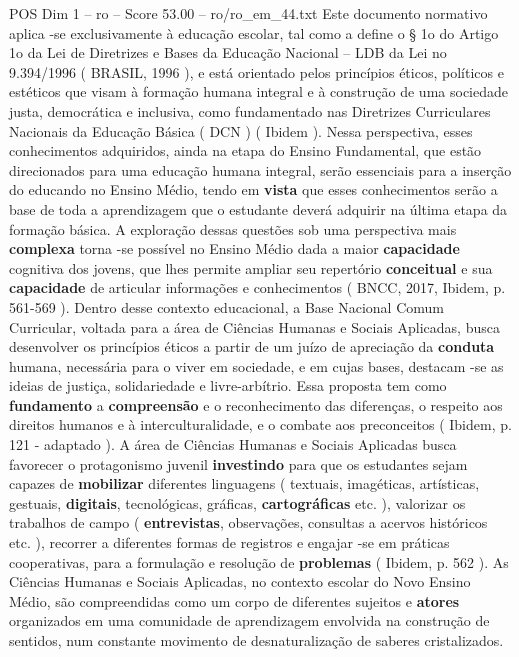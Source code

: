 \begin{textsample}{POS Dim 1 – ro – Score 53.00 – ro/ro\_em\_44.txt}
Este documento normativo aplica -se exclusivamente à educação escolar, tal como a define o § 1o do Artigo 1o da Lei de Diretrizes e Bases da Educação Nacional – LDB da Lei no 9.394/1996 ( BRASIL, 1996 ), e está orientado pelos princípios éticos, políticos e estéticos que visam à formação humana integral e à construção de uma sociedade justa, democrática e inclusiva, como fundamentado nas Diretrizes Curriculares Nacionais da Educação Básica ( DCN ) ( Ibidem ).
Nessa perspectiva, esses conhecimentos adquiridos, ainda na etapa do Ensino Fundamental, que estão direcionados para uma educação humana integral, serão essenciais para a inserção do educando no Ensino Médio, tendo em \textbf{vista} que esses conhecimentos serão a base de toda a aprendizagem que o estudante deverá adquirir na última etapa da formação básica.
A exploração dessas questões sob uma perspectiva mais \textbf{complexa} torna -se possível no Ensino Médio dada a maior \textbf{capacidade} cognitiva dos jovens, que lhes permite ampliar seu repertório \textbf{conceitual} e sua \textbf{capacidade} de articular informações e conhecimentos ( BNCC, 2017, Ibidem, p. 561-569 ).
Dentro desse contexto educacional, a Base Nacional Comum Curricular, voltada para a área de Ciências Humanas e Sociais Aplicadas, busca desenvolver os princípios éticos a partir de um juízo de apreciação da \textbf{conduta} humana, necessária para o viver em sociedade, e em cujas bases, destacam -se as ideias de justiça, solidariedade e livre-arbítrio.
Essa proposta tem como \textbf{fundamento} a \textbf{compreensão} e o reconhecimento das diferenças, o respeito aos direitos humanos e à interculturalidade, e o combate aos preconceitos ( Ibidem, p. 121 - adaptado ).
A área de Ciências Humanas e Sociais Aplicadas busca favorecer o protagonismo juvenil \textbf{investindo} para que os estudantes sejam capazes de \textbf{mobilizar} diferentes linguagens ( textuais, imagéticas, artísticas, gestuais, \textbf{digitais}, tecnológicas, gráficas, \textbf{cartográficas} etc. ), valorizar os trabalhos de campo ( \textbf{entrevistas}, observações, consultas a acervos históricos etc. ), recorrer a diferentes formas de registros e engajar -se em práticas cooperativas, para a formulação e resolução de \textbf{problemas} ( Ibidem, p. 562 ).
As Ciências Humanas e Sociais Aplicadas, no contexto escolar do Novo Ensino Médio, são compreendidas como um corpo de diferentes sujeitos e \textbf{atores} organizados em uma comunidade de aprendizagem envolvida na construção de sentidos, num constante movimento de desnaturalização de saberes cristalizados.

\end{textsample}
